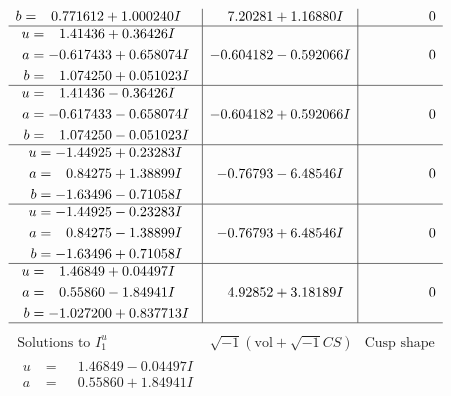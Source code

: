 \documentclass[1p]{elsarticle_modified}
\theoremstyle{definition}
\newcommand{\I}{\sqrt{-1}}
\begin{document}
$$\begin{array}{c|c|c}
\begin{aligned}
b &= \phantom{-}0.771612 + 1.000240 I\end{aligned}
 & \phantom{-}7.20281 + 1.16880 I & \phantom{-0.000000 } 0 \\ \hline\begin{aligned}
u &= \phantom{-}1.41436 + 0.36426 I \\
a &= -0.617433 + 0.658074 I \\
b &= \phantom{-}1.074250 + 0.051023 I\end{aligned}
 & -0.604182 - 0.592066 I & \phantom{-0.000000 } 0 \\ \hline\begin{aligned}
u &= \phantom{-}1.41436 - 0.36426 I \\
a &= -0.617433 - 0.658074 I \\
b &= \phantom{-}1.074250 - 0.051023 I\end{aligned}
 & -0.604182 + 0.592066 I & \phantom{-0.000000 } 0 \\ \hline\begin{aligned}
u &= -1.44925 + 0.23283 I \\
a &= \phantom{-}0.84275 + 1.38899 I \\
b &= -1.63496 - 0.71058 I\end{aligned}
 & -0.76793 - 6.48546 I & \phantom{-0.000000 } 0 \\ \hline\begin{aligned}
u &= -1.44925 - 0.23283 I \\
a &= \phantom{-}0.84275 - 1.38899 I \\
b &= -1.63496 + 0.71058 I\end{aligned}
 & -0.76793 + 6.48546 I & \phantom{-0.000000 } 0 \\ \hline\begin{aligned}
u &= \phantom{-}1.46849 + 0.04497 I \\
a &= \phantom{-}0.55860 - 1.84941 I \\
b &= -1.027200 + 0.837713 I\end{aligned}
 & \phantom{-}4.92852 + 3.18189 I & \phantom{-0.000000 } 0\\
 \hline 
 \end{array}$$\newpage$$\begin{array}{c|c|c}  
\text{Solutions to }I^u_{1}& \I (\text{vol} + \sqrt{-1}CS) & \text{Cusp shape}\\
 \hline 
\begin{aligned}
u &= \phantom{-}1.46849 - 0.04497 I \\
a &= \phantom{-}0.55860 + 1.84941 I \\

\end{aligned}
\end{array}$$
\end{document}
